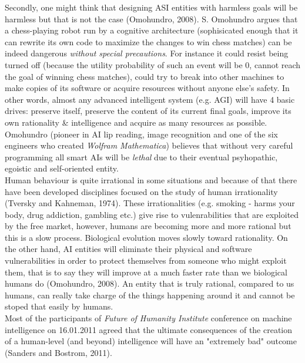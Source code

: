\documentclass[11pt]{article}
\begin{document}
	\indent
	Secondly, one might think that designing ASI entities with harmless goals will be harmless but that is not the case (Omohundro, 2008).
S. Omohundro argues that a chess-playing robot run by a cognitive architecture (sophisicated enough that it can rewrite its own code to maximize the changes to win chess matches) can be indeed dangerous \textit{without special precautions}. For instance it could resist being turned off (because the utility probability of such an event will be 0, cannot reach the goal of winning chess matches), could try to break into other machines to make copies of its software  or acquire resources without anyone else's safety. In other words, almost any advanced intelligent system (e.g. AGI) will have 4 basic drives: preserve itself, preserve the content of its current final goals, improve its own rationality \& intelligence and acquire as many resources as possible. Omohundro (pioneer in AI lip reading, image recognition and one of the six engineers who created \textit{Wolfram Mathematica}) believes that without very careful programming all smart AIs will be \textit{lethal} due to their eventual psyhopathic, egoistic and self-oriented entity.\\


	\indent
	Human behaviour is quite irrational in some situations and because of that there have been developed disciplines focused on the study of human irrationality (Tversky and Kahneman, 1974). These irrationalities (e.g. smoking - harms your body, drug addiction, gambling etc.) give rise to vulenrabilities that are exploited by the free market, however, humans are becoming more and more rational but this is a slow process. Biological evolution moves slowly toward rationality. On the other hand, AI entities will eliminate their physical  and software vulnerabilities in order to protect themselves from someone who might exploit them, that is to say they will  improve at a much faster rate than we biological humans do (Omohundro, 2008). An entity that is truly rational, compared to us humans, can really take charge of the things happening around it and cannot be stoped that easily by humans.\\
 

	\indent
	Most of the participants of \textit{Future of Humanity Institute} conference on machine intelligence on 16.01.2011 agreed that the ultimate consequences of the creation of a human-level (and beyond) intelligence will have an "extremely bad" outcome (Sanders and Bostrom, 2011).
\end{document}
